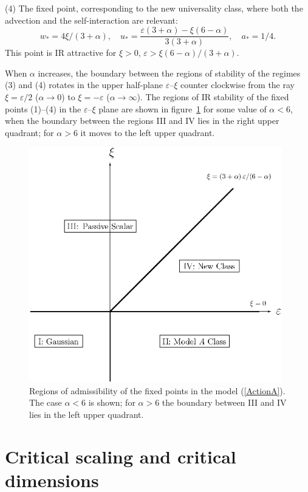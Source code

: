 \documentclass[12pt]{article}
\begin{document}
(4) The fixed point, corresponding to the new universality class, where
both the advection and the self-interaction are relevant:
\begin{equation}
w_{*}= 4\xi/(3+\alpha), \quad u_{*} = \frac{ \varepsilon (3+\alpha) -
\xi(6-\alpha)} {3(3+\alpha)}, \quad a_{*}=1/4.
\label{wu44}
\end{equation}
This point is IR attractive for $\xi>0$,
$\varepsilon> \xi (6-\alpha)/(3+\alpha)$.

When $\alpha$ increases, the boundary between the regions of stability of
the regimes (3) and (4) rotates in the upper half-plane $\varepsilon$--$\xi$
counter clockwise from the ray $\xi=\varepsilon/2$ ($\alpha\to0$) to
$\xi=-\varepsilon$ ($\alpha\to\infty$).
The regions of IR stability of the fixed points (1)--(4) in the
$\varepsilon$--$\xi$ plane are shown in figure~\ref{fig:pattA}
for some value of $\alpha<6$, when the boundary between the regions
III and IV lies in the right upper quadrant; for $\alpha>6$ it moves
to the left upper quadrant.

\begin{figure}
\begin{center}
\includegraphics[width=11cm]{PATT_A.EPS}
\caption{\label{fig:pattA} Regions of admissibility of the fixed points
in the model (\protect\ref{ActionA}). The case $\alpha<6$ is shown;
for $\alpha>6$ the boundary between III and IV lies in the left
upper quadrant.}
\end{center}
\end{figure}


\section{Critical scaling and critical dimensions} \label{sec:DimeNS}
\end{document}
